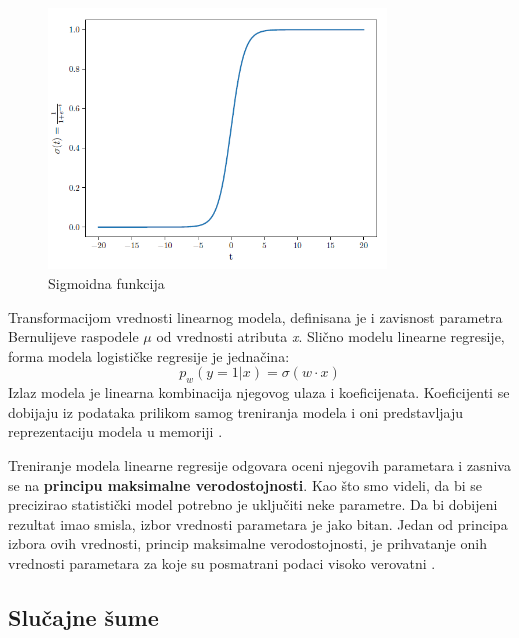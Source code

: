 \documentclass[12pt,oneside]{memoir}
\begin{document}
\begin{figure}[!ht]
  \centering
  \includegraphics[width=0.8\textwidth]{sigma.png}
  \caption{Sigmoidna funkcija}
  \label{fig:sigmagraph}
\end{figure}

Transformacijom vrednosti linearnog modela, definisana je i zavisnost parametra Bernulijeve raspodele $\mu$ od vrednosti atributa \textit{x}. Slično modelu linearne regresije, forma modela logističke regresije je jednačina: $$  p_w (y=1|x) = \sigma(w \cdot x) $$Izlaz modela je linearna kombinacija njegovog ulaza i koeficijenata. Koeficijenti se dobijaju iz podataka prilikom samog treniranja modela i oni predstavljaju reprezentaciju modela u memoriji \cite{mladen, mlm}.

Treniranje modela linearne regresije odgovara oceni njegovih parametara i zasniva se na \textbf{principu maksimalne verodostojnosti}. Kao što smo videli, da bi se precizirao statistički model potrebno je uključiti neke parametre. Da bi dobijeni rezultat imao smisla, izbor vrednosti parametara je jako bitan. Jedan od principa izbora ovih vrednosti, princip maksimalne verodostojnosti, je prihvatanje onih vrednosti parametara za koje su posmatrani podaci visoko verovatni \cite{mladen}.

\subsection{Slučajne šume}
\end{document}

